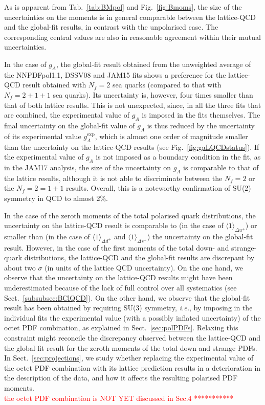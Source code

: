 As is apparent from Tab.~\ref{tab:BMpol} and Fig.~\ref{fig:Bmoms}, the size of 
the uncertainties on the moments is in general comparable between the 
lattice-QCD and the global-fit results, in contrast  with the unpolarised case.
%
The corresponding central values are also in reasonable agreement within their
mutual uncertainties.

In the case of $g_A$, the global-fit result obtained from the unweighted 
average of the NNPDFpol1.1, DSSV08 and JAM15 fits shows a preference for the
lattice-QCD result obtained with $N_f=2$ sea quarks (compared to that with 
$N_f=2+1+1$ sea quarks).
%
Its uncertainty is, however, four times smaller than that of both lattice results.
%
This is not unexpected, since, in all the three fits that are combined, the 
experimental value of $g_A$ is imposed in the fits themselves.
%
The final uncertainty on the global-fit value of $g_A$ is thus reduced by 
the uncertainty of its experimental value $g_A^\text{exp}$, which is almost
one order of magnitude smaller than the uncertainty on the lattice-QCD results
(see Fig.~\ref{fig:gaLQCDstatus}).
%
If the experimental value of $g_A$ is not imposed as a boundary condition in 
the fit, as in the JAM17 analysis, the size of the uncertainty on $g_A$ is 
comparable to that of the lattice results, although it is not able to 
discriminate between the $N_f=2$ or the $N_f=2=1+1$ results.
%
Overall, this is a noteworthy confirmation of SU(2) symmetry in QCD to
almost 2\%.

In the case of the zeroth moments of the total polarised quark distributions,
the uncertainty on the lattice-QCD result is comparable to (in the case
of $\langle 1 \rangle_{\Delta u^+}$) or smaller than (in the case
of $\langle 1 \rangle_{\Delta d^+}$ and $\langle 1 \rangle_{\Delta s^+}$)
the uncertainty on the global-fit result.
%
However, in the case of the first moments of the total down- and strange-quark 
distributions, the lattice-QCD and the global-fit results are discrepant
by about two $\sigma$ (in units of the
lattice QCD uncertainty).
%
On the one hand, we observe that the uncertainty on the lattice-QCD results 
might have been underestimated because of the lack of full control over
all systematics (see Sect.~\ref{subsubsec:BClQCD}).
%
On the other hand, we observe that the global-fit result has been obtained
by requiring SU(3) symmetry, {\it i.e.}, by imposing in the individual fits 
the experimental value (with a possibly inflated uncertainty) of the octet PDF 
combination, as explained in Sect.~\ref{sec:polPDFs}.
%
Relaxing this constraint might reconcile the discrepancy observed between 
the lattice-QCD and the global-fit result for the zeroth moments of the 
total down and strange PDFs.
%
In Sect.~\ref{sec:projections}, we study whether replacing the experimental
value of the octet PDF combination with its lattice prediction
results in a deterioration in the description of the data, and how it 
affects the resulting polarised PDF moments.
\\
\textcolor{red}{ the octet PDF combination is NOT YET discussed in Sec.4 ***********}
 
